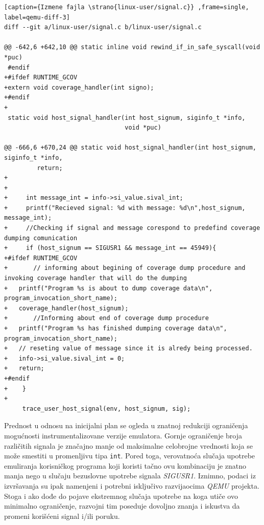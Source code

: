 \documentclass[12pt,oneside]{memoir}
\newcommand{\kod}[1]{\texttt{#1}}
\newcommand{\strano}[1]{\textit{#1}}
\begin{document}
\begin{lstlisting}[caption={Izmene fajla \strano{linux-user/signal.c}} ,frame=single, label=qemu-diff-3]
diff --git a/linux-user/signal.c b/linux-user/signal.c

@@ -642,6 +642,10 @@ static inline void rewind_if_in_safe_syscall(void *puc)
 #endif
+#ifdef RUNTIME_GCOV
+extern void coverage_handler(int signo);
+#endif
+
 static void host_signal_handler(int host_signum, siginfo_t *info,
                                 void *puc)

@@ -666,6 +670,24 @@ static void host_signal_handler(int host_signum, siginfo_t *info,
         return;
+
+     
+     int message_int = info->si_value.sival_int;
+     printf("Recieved signal: %d with message: %d\n",host_signum, message_int);
+     //Checking if signal and message corespond to predefind coverage dumping comunication
+     if (host_signum == SIGUSR1 && message_int == 45949){
+#ifdef RUNTIME_GCOV
+       // informing about begining of coverage dump procedure and invoking coverage handler that will do the dumping
+	printf("Program %s is about to dump coverage data\n", program_invocation_short_name);
+	coverage_handler(host_signum);
+       //Informing about end of coverage dump procedure
+	printf("Program %s has finished dumping coverage data\n", program_invocation_short_name);
+	// reseting value of message since it is alredy being processed.
+	info->si_value.sival_int = 0;
+	return;
+#endif
+    }
+
     trace_user_host_signal(env, host_signum, sig);
\end{lstlisting}

Prednost u odnosu na inicijalni plan se ogleda u znatnoj redukciji ograničenja mogućnosti instrumentalizovane verzije emulatora. Gornje ograničenje broja različitih signala je značajno manje od maksimalne celobrojne vrednosti koja se može smestiti u promenljivu tipa \kod{int}. Pored toga, verovatnoća slučaja upotrebe emuliranja korisničkog programa koji koristi tačno ovu kombinaciju je znatno manja nego u slučaju bezuslovne upotrebe signala \strano{SIGUSR1}. Iznimno, podaci iz izvršavanja su ipak namenjeni i potrebni isključivo razvijaocima \strano{QEMU} projekta. Stoga i ako dođe do pojave ekstremnog slučaja upotrebe na koga utiče ovo minimalno ograničenje, razvojni tim poseduje dovoljno znanja i iskustva da promeni korišćeni signal i/ili poruku. 
\end{document}
